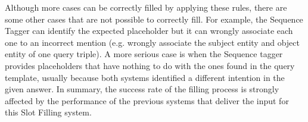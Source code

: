 Although more cases can be correctly filled by applying these rules, there are some other 
cases that are not possible to correctly fill. For example, the Sequence Tagger can identify 
the expected placeholder but it can wrongly associate each one to an incorrect mention (e.g. 
wrongly associate the subject entity and object entity of one query triple). A more serious 
case is when the Sequence tagger provides placeholders that have nothing to do with the ones 
found in the query template, usually because both systems identified a different intention in 
the given answer. In summary, the success rate of the filling process is strongly affected by 
the performance of the previous systems that deliver the input for this Slot Filling system.
